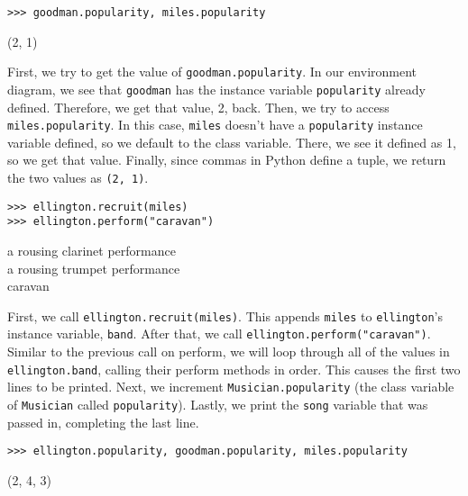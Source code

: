 \begin{blocksection}
\begin{lstlisting}
>>> goodman.popularity, miles.popularity
\end{lstlisting}
\begin{solution}[.2in]
(2, 1)

First, we try to get the value of \lstinline{goodman.popularity}. In our environment diagram, we see that \lstinline{goodman} has the instance variable \lstinline{popularity} already defined. Therefore, we get that value, 2, back. Then, we try to access \lstinline{miles.popularity}. In this case, \lstinline{miles} doesn’t have a \lstinline{popularity} instance variable defined, so we default to the class variable. There, we see it defined as 1, so we get that value. Finally, since commas in Python define a tuple, we return the two values as \lstinline{(2, 1)}.
\end{solution}

\vspace{1\baselineskip}

\begin{lstlisting}
>>> ellington.recruit(miles)
>>> ellington.perform("caravan")
\end{lstlisting}
\begin{solution}[.2in]
a rousing clarinet performance\\
a rousing trumpet performance\\
caravan

First, we call \lstinline{ellington.recruit(miles)}. This appends \lstinline{miles} to \lstinline{ellington}'s instance variable, \lstinline{band}. After that, we call \lstinline{ellington.perform("caravan")}. Similar to the previous call on perform, we will loop through all of the values in \lstinline{ellington.band}, calling their perform methods in order. This causes the first two lines to be printed. Next, we increment \lstinline{Musician.popularity} (the class variable of \lstinline{Musician} called \lstinline{popularity}). Lastly, we print the \lstinline{song} variable that was passed in, completing the last line.
\end{solution}

\vspace{2\baselineskip}

\begin{lstlisting}
>>> ellington.popularity, goodman.popularity, miles.popularity
\end{lstlisting}
\begin{solution}[.2in]
(2, 4, 3)
\end{solution}


\end{blocksection}
